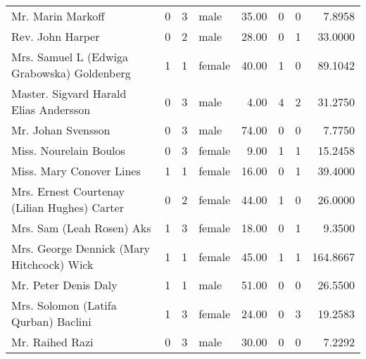 \begin{tabular}{lrrlrrrr}
Mr. Marin Markoff                                  &         0 &       3 &    male &  35.00 &                        0 &                        0 &    7.8958 \\
Rev. John Harper                                   &         0 &       2 &    male &  28.00 &                        0 &                        1 &   33.0000 \\
Mrs. Samuel L (Edwiga Grabowska) Goldenberg        &         1 &       1 &  female &  40.00 &                        1 &                        0 &   89.1042 \\
Master. Sigvard Harald Elias Andersson             &         0 &       3 &    male &   4.00 &                        4 &                        2 &   31.2750 \\
Mr. Johan Svensson                                 &         0 &       3 &    male &  74.00 &                        0 &                        0 &    7.7750 \\
Miss. Nourelain Boulos                             &         0 &       3 &  female &   9.00 &                        1 &                        1 &   15.2458 \\
Miss. Mary Conover Lines                           &         1 &       1 &  female &  16.00 &                        0 &                        1 &   39.4000 \\
Mrs. Ernest Courtenay (Lilian Hughes) Carter       &         0 &       2 &  female &  44.00 &                        1 &                        0 &   26.0000 \\
Mrs. Sam (Leah Rosen) Aks                          &         1 &       3 &  female &  18.00 &                        0 &                        1 &    9.3500 \\
Mrs. George Dennick (Mary Hitchcock) Wick          &         1 &       1 &  female &  45.00 &                        1 &                        1 &  164.8667 \\
Mr. Peter Denis Daly                               &         1 &       1 &    male &  51.00 &                        0 &                        0 &   26.5500 \\
Mrs. Solomon (Latifa Qurban) Baclini               &         1 &       3 &  female &  24.00 &                        0 &                        3 &   19.2583 \\
Mr. Raihed Razi                                    &         0 &       3 &    male &  30.00 &                        0 &                        0 &    7.2292 \\

\end{tabular}
